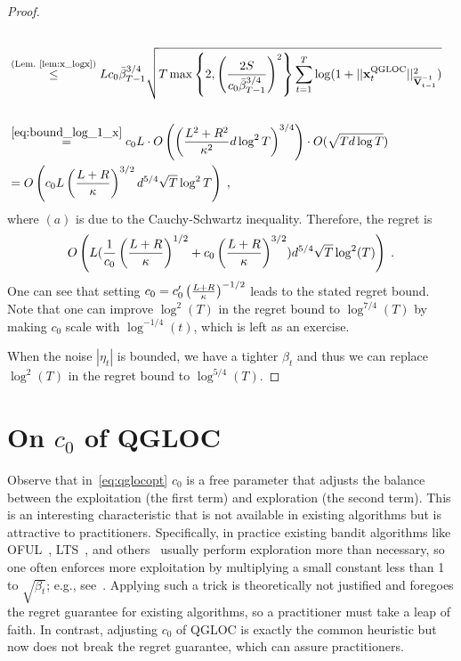 \begin{proof}
\begin{align*}
\\&\stackrel{(\text{Lem.~\ref{lem:x_logx}})}{\le} Lc_0 \bar\beta_{T-1}^{3/4} \sqrt{T \max\left\{ 2, \left({ \frac{2S}{c_0\bar\beta^{3/4}_{T-1}} }\right)^2 \right\} \sum_{t=1}^T  \log(1 + || \mathbf{x}_t^{\text{\normalfont QGLOC}} ||^2_{\overline{\mathbf{V}}^{-1}_{t-1}}) } \\
\\&\stackrel{\eqref{eq:bound_log_1_x}}{=} c_0 L \cdot O\left( \left({ \frac{L^2+R^2}{{\kappa}^2} } d\log^2 T\right)^{3/4} \right) \cdot O(\sqrt{T d \log T})
\\&= O\left( c_0 L \left({ \frac{ L + R}{{\kappa}} }\right)^{3/2} d^{5/4} \sqrt{T} \log^2 T \right) \; ,
\end{align*}
where $(a)$ is due to the Cauchy-Schwartz inequality.
Therefore, the regret is 
\[
  O\left(  L({ \frac{1}{c_0} }\left( { \frac{L+R}{{\kappa}} } \right)^{1/2} + c_0\left( { \frac{L+R}{{\kappa}} } \right)^{3/2} )  d^{5/4} \sqrt{T} \log^2(T)\right)\;.
\]
One can see that setting $c_0 = c'_0 \left( { \frac{L+R}{{\kappa}} } \right)^{-1/2}$ leads to the stated regret bound.
Note that one can improve $\log^2(T)$ in the regret bound to $\log^{7/4}(T)$ by making $c_0$ scale with $\log^{-1/4}(t)$, which is left as an exercise.

When the noise $|\eta_t|$ is bounded, we have a tighter $\beta_t$ and thus we can replace $\log^2(T)$ in the regret bound to $\log^{5/4}(T)$.
\end{proof}

\vspace{-5pt}
\section{On \texorpdfstring{${c_0}$}{} of QGLOC}
\vspace{-5pt}

Observe that in~\eqref{eq:qglocopt} $c_0$  is a free parameter that adjusts the balance between the exploitation (the first term) and exploration (the second term).
This is an interesting characteristic that is not available in existing algorithms but is attractive to practitioners. 
Specifically, in practice existing bandit algorithms like OFUL~\cite{ay11improved}, LTS~\cite{agrawal13thompson}, and others~\cite{filippi10parametric,zhang16online} usually perform exploration more than necessary, so one often enforces more exploitation by multiplying a small constant less than 1 to $\sqrt{\beta_t}$; e.g., see~\cite{yue12hierarchical,chapelle11anempirical}.
Applying such a trick is theoretically not justified and foregoes the regret guarantee for existing algorithms, so a practitioner must take a leap of faith.
In contrast, adjusting $c_0$ of QGLOC is exactly the common heuristic but now does not break the regret guarantee, which can assure practitioners.


